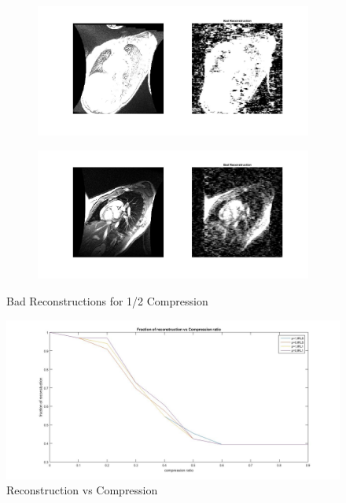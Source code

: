 \documentclass[a4paper]{article}
\begin{document}
\begin{figure}[h]
\begin{subfigure}{.5\textwidth}
  \centering
  \includegraphics[width = 6in]{bad21.jpg}
  \label{fig:sfig1}
\end{subfigure}%

\begin{subfigure}{.5\textwidth}
  \centering
  \includegraphics[width = 6in]{bad22.jpg}
  \label{fig:sfig2}
\end{subfigure}
\caption{Bad Reconstructions for 1/2 Compression}
\end{figure}

\begin{figure}
\centering
\includegraphics[width = 7in]{combo3.jpg}
\caption{Reconstruction vs Compression}
\end{figure}
\end{document}
